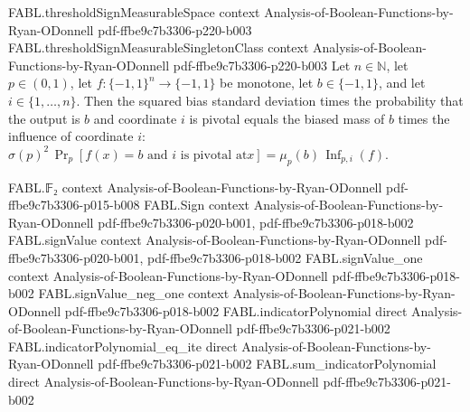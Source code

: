 \begin{theorem}
\proofstep
  {FABL.thresholdSignMeasurableSpace}
  {context}
  {Analysis-of-Boolean-Functions-by-Ryan-ODonnell}
  {pdf-ffbe9c7b3306-p220-b003}
\proofstep
  {FABL.thresholdSignMeasurableSingletonClass}
  {context}
  {Analysis-of-Boolean-Functions-by-Ryan-ODonnell}
  {pdf-ffbe9c7b3306-p220-b003}
Let $n\in\mathbb{N}$, let $p\in(0,1)$, let $f:\{-1,1\}^n\to\{-1,1\}$ be monotone, let
$b\in\{-1,1\}$, and let $i\in\{1,\ldots,n\}$. Then the squared bias standard deviation
times the probability that the output is $b$ and coordinate $i$ is pivotal equals the
biased mass of $b$ times the influence of coordinate $i$:
$\sigma(p)^2\,\Pr_p[f(x)=b\text{ and }i\text{ is pivotal at
}x]=\mu_p(b)\,\operatorname{Inf}_{p,i}(f)$.
\end{theorem}

\begin{theorem}
\label{FABL.productInfluence_eq_four_mul_complement_mul_negOnePivotalProbability_of_monotone}
\leanok
{}
\proofstep
  {FABL.𝔽₂}
  {context}
  {Analysis-of-Boolean-Functions-by-Ryan-ODonnell}
  {pdf-ffbe9c7b3306-p015-b008}
\proofstep
  {FABL.Sign}
  {context}
  {Analysis-of-Boolean-Functions-by-Ryan-ODonnell}
  {pdf-ffbe9c7b3306-p020-b001,
    pdf-ffbe9c7b3306-p018-b002}
\proofstep
  {FABL.signValue}
  {context}
  {Analysis-of-Boolean-Functions-by-Ryan-ODonnell}
  {pdf-ffbe9c7b3306-p020-b001,
    pdf-ffbe9c7b3306-p018-b002}
\proofstep
  {FABL.signValue_one}
  {context}
  {Analysis-of-Boolean-Functions-by-Ryan-ODonnell}
  {pdf-ffbe9c7b3306-p018-b002}
\proofstep
  {FABL.signValue_neg_one}
  {context}
  {Analysis-of-Boolean-Functions-by-Ryan-ODonnell}
  {pdf-ffbe9c7b3306-p018-b002}
\proofstep
  {FABL.indicatorPolynomial}
  {direct}
  {Analysis-of-Boolean-Functions-by-Ryan-ODonnell}
  {pdf-ffbe9c7b3306-p021-b002}
\proofstep
  {FABL.indicatorPolynomial_eq_ite}
  {direct}
  {Analysis-of-Boolean-Functions-by-Ryan-ODonnell}
  {pdf-ffbe9c7b3306-p021-b002}
\proofstep
  {FABL.sum_indicatorPolynomial}
  {direct}
  {Analysis-of-Boolean-Functions-by-Ryan-ODonnell}
  {pdf-ffbe9c7b3306-p021-b002}

\end{theorem}
